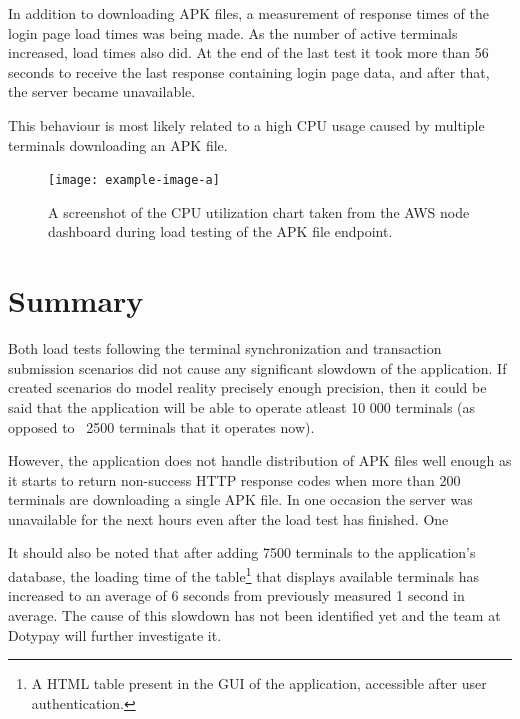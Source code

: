 \documentclass[12pt, a4paper]{article}
\let\oldsection\section
\renewcommand\section{\clearpage\oldsection}
\begin{document}
In addition to downloading APK files, a measurement of response times of the login page load times was being made.
As the number of active terminals increased, load times also did.
At the end of the last test it took more than 56 seconds to receive the last response containing login page data, and after that, the server became unavailable.

This behaviour is most likely related to a high CPU usage caused by multiple terminals downloading an APK file.

\begin{figure}[!ht]
    \centering 
    \texttt{[image: example-image-a]}
    \caption{A screenshot of the CPU utilization chart taken from the AWS node dashboard during load testing of the APK file endpoint.}
    \label{fig:cpu-usage-2}
\end{figure}

\section{Summary}
Both load tests following the terminal synchronization and transaction submission scenarios did not cause any significant slowdown of the application.
If created scenarios do model reality precisely enough precision, then it could be said that the application will be able to operate atleast 10 000 terminals (as opposed to ~2500 terminals that it operates now).

However, the application does not handle distribution of APK files well enough as it starts to return non-success HTTP response codes when more than 200 terminals are downloading a single APK file.
In one occasion the server was unavailable for the next hours even after the load test has finished.
One 

It should also be noted that after adding 7500 terminals to the application's database, the loading time of the table\footnote{A HTML table present in the GUI of the application, accessible after user authentication.} that displays available terminals has increased to an average of 6 seconds from previously measured 1 second in average.
The cause of this slowdown has not been identified yet and the team at Dotypay will further investigate it.
\end{document}
